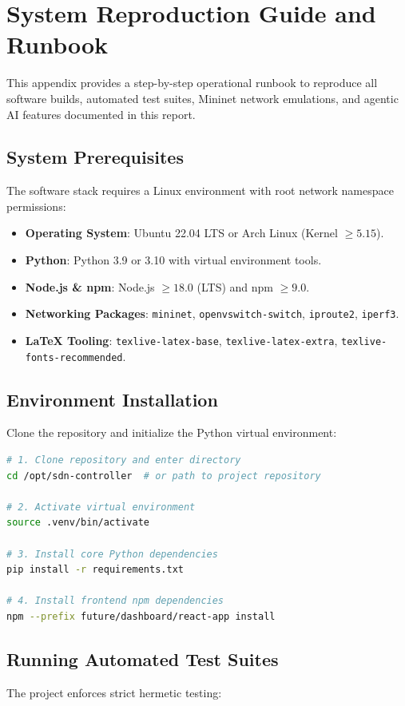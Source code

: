 \chapter{System Reproduction Guide and Runbook}
\label{app:runbook}

This appendix provides a step-by-step operational runbook to reproduce all software builds, automated test suites, Mininet network emulations, and agentic AI features documented in this report.

\section{System Prerequisites}
The software stack requires a Linux environment with root network namespace permissions:
\begin{itemize}
  \item \textbf{Operating System}: Ubuntu 22.04 LTS or Arch Linux (Kernel $\ge 5.15$).
  \item \textbf{Python}: Python 3.9 or 3.10 with virtual environment tools.
  \item \textbf{Node.js \& npm}: Node.js $\ge 18.0$ (LTS) and npm $\ge 9.0$.
  \item \textbf{Networking Packages}: \texttt{mininet}, \texttt{openvswitch-switch}, \texttt{iproute2}, \texttt{iperf3}.
  \item \textbf{LaTeX Tooling}: \texttt{texlive-latex-base}, \texttt{texlive-latex-extra}, \texttt{texlive-fonts-recommended}.
\end{itemize}

\section{Environment Installation}
Clone the repository and initialize the Python virtual environment:
\begin{lstlisting}[language=bash]
# 1. Clone repository and enter directory
cd /opt/sdn-controller  # or path to project repository

# 2. Activate virtual environment
source .venv/bin/activate

# 3. Install core Python dependencies
pip install -r requirements.txt

# 4. Install frontend npm dependencies
npm --prefix future/dashboard/react-app install
\end{lstlisting}

\section{Running Automated Test Suites}
The project enforces strict hermetic testing:

